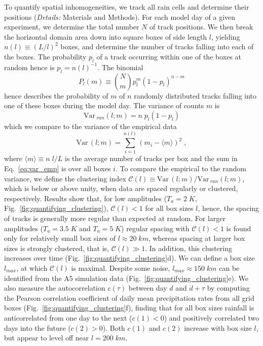 \documentclass[draft,linenumbers]{agujournal2019}
\def\Var{{\textrm{Var}}\,}
\begin{document}
To quantify spatial inhomogeneities, we track all rain cells and determine their positions ({\it Details:} Materials and Methods).
For each model day of a given experiment, we determine the total number $N$ of track positions.
We then break the horizontal domain area down into square boxes of side length $l$, yielding $n(l)\equiv (L/l)^2$ boxes, and determine the number of tracks falling into each of the boxes.
The probability $p_l$ of a track occurring within one of the boxes at random hence is $p_l=n(l)^{-1}$.
The binomial
\begin{equation}
P_l(m)\equiv {N\choose m}p_l^m\left( 1-p_l \right)^{n-m}
\label{eq:binomial}
\end{equation}
hence describes the probability of $m$ of $n$ randomly distributed tracks falling into one of these boxes during the model day.
The variance of counts $m$ is\cite{feller1957introduction} 
\begin{equation}
\Var_{ran}(l;m) = n\;p_l(1-p_l)
\label{eq:var_ran}
\end{equation}
which we compare to the variance of the empirical data 
\begin{equation}
\Var(l;m) = \sum_{i=1}^{n(l)}(m_i-\langle m\rangle)^2\;,
\label{eq:var_emp}
\end{equation}
where $\langle m\rangle\equiv n\;l/L$ is the average number of tracks per box and the sum in Eq.~\ref{eq:var_emp} is over all boxes $i$.
To compare the empirical to the random variance, we define the clustering index $\mathcal{C}(l)\equiv \Var(l;m)/\Var_{ran}(l;m)$, which is below or above unity, when data are spaced regularly or clustered, respectively.
Results show that, for low amplitudes ($T_a=2\;K$, Fig.~\ref{fig:quantifying_clustering}), $\mathcal{C}(l)<1$ for all box sizes $l$, hence, the spacing of tracks is generally more regular than expected at random.
For larger amplitudes ($T_a=3.5\;K$ and $T_a=5\;K$) regular spacing with $\mathcal{C}(l)<1$ is found only for relatively small box sizes of $l\approx 20\;km$, whereas spacing at larger box sizes is strongly clustered, that is, $\mathcal{C}(l)\gg 1$.
In addition, this clustering increases over time (Fig.~\ref{fig:quantifying_clustering}d).
We can define a box size $l_{max}$, at which $\mathcal{C}(l)$ is maximal.
Despite some noise, $l_{max}\approx 150\;km$ can be identified from the A5 simulation data (Fig.~\ref{fig:quantifying_clustering}e).
We also measure the autocorrelation $c(\tau)$ between day $d$ and $d+\tau$ by computing the Pearson correlation coefficient of daily mean precipitation rates from all grid boxes (Fig.~\ref{fig:quantifying_clustering}f), finding that for all box sizes rainfall is anticorrelated from one day to the next ($c(1)<0$) and positively correlated two days into the future ($c(2)>0$).
Both $c(1)$ and $c(2)$ increase with box size $l$, but appear to level off near $l=200\;km$.
\end{document}
